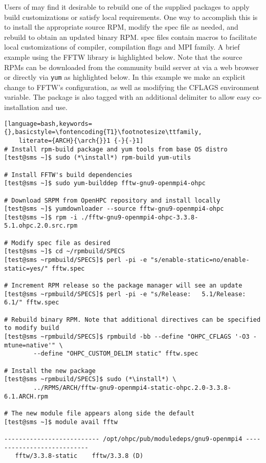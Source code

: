 Users of \OHPC{} may find it desirable to rebuild one of the supplied packages
to apply build customizations or satisfy local requirements. One way to
accomplish this is to install the appropriate source RPM, modify the spec file
as needed, and rebuild to obtain an updated binary RPM. \OHPC{} spec files
contain macros to facilitate local customizations of compiler, compilation
flags and MPI family. A brief example using
the FFTW library is highlighted below.  Note that the source RPMs can be downloaded from the
community build server at \href{https://build.openhpc.community}
{\color{blue}{https://build.openhpc.community}} via a web browser or directly
via \texttt{yum} as highlighted below. In this example we make an explicit
change to FFTW's configuration, as well as modifying the CFLAGS environment
variable. The package is also tagged with an additional delimiter to allow easy
co-installation and use. 

\begin{lstlisting}[language=bash,keywords={},basicstyle=\fontencoding{T1}\footnotesize\ttfamily,
    literate={ARCH}{\arch{}}1 {-}{-}1]
# Install rpm-build package and yum tools from base OS distro
[test@sms ~]$ sudo (*\install*) rpm-build yum-utils

# Install FFTW's build dependencies
[test@sms ~]$ sudo yum-builddep fftw-gnu9-openmpi4-ohpc

# Download SRPM from OpenHPC repository and install locally
[test@sms ~]$ yumdownloader --source fftw-gnu9-openmpi4-ohpc
[test@sms ~]$ rpm -i ./fftw-gnu9-openmpi4-ohpc-3.3.8-5.1.ohpc.2.0.src.rpm

# Modify spec file as desired
[test@sms ~]$ cd ~/rpmbuild/SPECS
[test@sms ~rpmbuild/SPECS]$ perl -pi -e "s/enable-static=no/enable-static=yes/" fftw.spec

# Increment RPM release so the package manager will see an update
[test@sms ~rpmbuild/SPECS]$ perl -pi -e "s/Release:   5.1/Release:   6.1/" fftw.spec

# Rebuild binary RPM. Note that additional directives can be specified to modify build
[test@sms ~rpmbuild/SPECS]$ rpmbuild -bb --define "OHPC_CFLAGS '-O3 -mtune=native'" \
        --define "OHPC_CUSTOM_DELIM static" fftw.spec

# Install the new package
[test@sms ~rpmbuild/SPECS]$ sudo (*\install*) \
        ../RPMS/ARCH/fftw-gnu9-openmpi4-static-ohpc.2.0-3.3.8-6.1.ARCH.rpm

# The new module file appears along side the default
[test@sms ~]$ module avail fftw

-------------------------- /opt/ohpc/pub/moduledeps/gnu9-openmpi4 ---------------------------
   fftw/3.3.8-static    fftw/3.3.8 (D)
\end{lstlisting}
